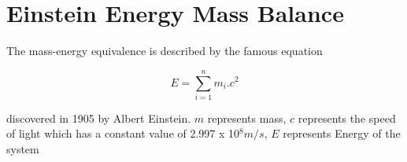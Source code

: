 

\section{Einstein Energy Mass Balance}
The mass-energy equivalence is described by the famous equation

\[E=\sum_{i=1}^{n} m_i .c^2\]

discovered in 1905 by Albert Einstein. 
\vspace{1em}
\newline 
$m$ represents mass, $c$ represents the speed of light which has a constant value of 2.997 x 10$^8 m/s$, $E$ represents Energy of the system

